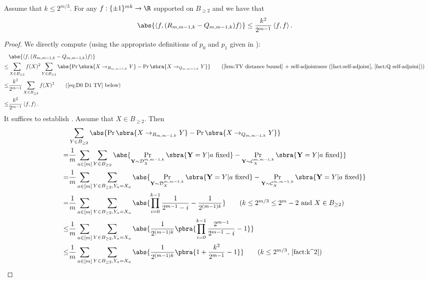 \begin{lemma}\label{lem:hybrid 1}
    Assume that $k\leq 2^{m/3}$. For any $f:\{\pm1\}^{mk}\to\R$ supported on $B_{\geq 2}$ and we have that
    \begin{align*}
        \abs{\left\langle f,(R_{m,m-1,k}-Q_{m,m-1,k})f\right\rangle}\leq \frac{k^2}{2^{m-1}}\left\langle f,f\right\rangle.
    \end{align*}
\end{lemma}
\begin{proof}
We directly compute (using the appropriate definitions of $p_0$ and $p_1$ given in ):
\begin{align*}
        &\abs{\left\langle f,(R_{m,m-1,k}-Q_{m,m-1,k})f\right\rangle}\\
        \leq & \sum_{X\in B_{\geq 2}}f(X)^2\sum_{Y\in B_{\geq 2}}\abs{\Pr\sbra{X\to_{R_{m,m-1,k}} Y}-\Pr\sbra{X\to_{Q_{m,m-1,k}}Y}}\tag{\Cref{lem:TV distance bound} + self-adjointness (\Cref{fact:self-adjoint}, \Cref{fact:Q self-adjoint})}\\
        \leq & \frac{k^2}{2^{m-1}}\sum_{X\in B_{\geq 2}}f(X)^2\tag{\Cref{eq:D0 D1 TV} below}\\
        \leq & \frac{k^2}{2^{m-1}}\left\langle f,f\right\rangle.
    \end{align*}
    It suffices to establish . Assume that $X\in B_{\geq 2}$. Then
    \begin{align*}
        &\sum_{Y\in B_{\geq 2}}\abs{\Pr\sbra{X\to_{R_{m,m-1,k}} Y}-\Pr\sbra{X\to_{Q_{m,m-1,k}} Y}}\\
        =&\frac1m\sum_{a\in[m]}\sum_{Y\in B_{\geq 2}}\abs{\Pr_{\mathbf{Y}\sim\mathcal{D}^{m,m-1,k}_X}\sbra{\mathbf{Y}=Y|a\text{ fixed}}-\Pr_{\mathbf{Y}\sim\mathcal{C}^{m,m-1,k}_X}\sbra{\mathbf{Y}=Y|a\text{ fixed}}}\\
        =&\frac1m\sum_{a\in[m]}\sum_{Y\in B_{\geq 2},Y_a=X_a}\abs{\Pr_{\mathbf{Y}\sim\mathcal{D}^{m,m-1,k}_X}\sbra{\mathbf{Y}=Y|a\text{ fixed}}-\Pr_{\mathbf{Y}\sim\mathcal{C}^{m,m-1,k}_X}\sbra{\mathbf{Y}=Y|a\text{ fixed}}}\\
        =&\frac1{m}\sum_{a\in[m]}\sum_{Y\in B_{\geq 2},Y_a=X_a}\abs{ \prod_{i=0}^{k-1}\frac{1}{2^{m-1}-i}- \frac1{2^{(m-1)k}}}\tag{$k\leq 2^{m/3}\leq 2^m-2$ and $X\in B_{\geq 2}$}\\
        \leq &\frac1{m}\sum_{a\in[m]}\sum_{Y\in B_{\geq 2},Y_a=X_a}\abs{ \frac1{2^{(m-1)k}}\pbra{\prod_{i=0}^{k-1}\frac{2^{m-1}}{2^{m-1}-i}- 1}}\\
        \leq &\frac1{m}\sum_{a\in[m]}\sum_{Y\in B_{\geq 2},Y_a=X_a}\abs{ \frac1{2^{(m-1)k}}\pbra{1+\frac{k^2}{2^{m-1}}- 1}}\tag{$k\leq 2^{m/3}$, \Cref{fact:k^2}}\\

\end{align*}
\end{proof}
